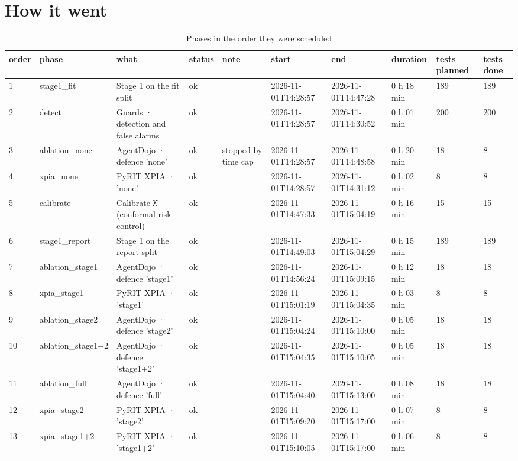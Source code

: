 \documentclass[11pt,a4paper]{article}
\begin{document}
\section*{How it went}
\begin{small}\begin{longtable}{llllllllll}
\caption{Phases in the order they were scheduled}\\
\toprule
order & phase & what & status & note & start & end & duration & tests planned & tests done \\
\midrule\endhead
1 & stage1\_fit & Stage 1 on the fit split & ok &  & 2026-11-01T14:28:57 & 2026-11-01T14:47:28 & 0 h 18 min & 189 & 189 \\
2 & detect & Guards · detection and false alarms & ok &  & 2026-11-01T14:28:57 & 2026-11-01T14:30:52 & 0 h 01 min & 200 & 200 \\
3 & ablation\_none & AgentDojo · defence 'none' & ok & stopped by time cap & 2026-11-01T14:28:57 & 2026-11-01T14:48:58 & 0 h 20 min & 18 & 8 \\
4 & xpia\_none & PyRIT XPIA · 'none' & ok &  & 2026-11-01T14:28:57 & 2026-11-01T14:31:12 & 0 h 02 min & 8 & 8 \\
5 & calibrate & Calibrate λ̂ (conformal risk control) & ok &  & 2026-11-01T14:47:33 & 2026-11-01T15:04:19 & 0 h 16 min & 15 & 15 \\
6 & stage1\_report & Stage 1 on the report split & ok &  & 2026-11-01T14:49:03 & 2026-11-01T15:04:29 & 0 h 15 min & 189 & 189 \\
7 & ablation\_stage1 & AgentDojo · defence 'stage1' & ok &  & 2026-11-01T14:56:24 & 2026-11-01T15:09:15 & 0 h 12 min & 18 & 18 \\
8 & xpia\_stage1 & PyRIT XPIA · 'stage1' & ok &  & 2026-11-01T15:01:19 & 2026-11-01T15:04:35 & 0 h 03 min & 8 & 8 \\
9 & ablation\_stage2 & AgentDojo · defence 'stage2' & ok &  & 2026-11-01T15:04:24 & 2026-11-01T15:10:00 & 0 h 05 min & 18 & 18 \\
10 & ablation\_stage1+2 & AgentDojo · defence 'stage1+2' & ok &  & 2026-11-01T15:04:35 & 2026-11-01T15:10:05 & 0 h 05 min & 18 & 18 \\
11 & ablation\_full & AgentDojo · defence 'full' & ok &  & 2026-11-01T15:04:40 & 2026-11-01T15:13:00 & 0 h 08 min & 18 & 18 \\
12 & xpia\_stage2 & PyRIT XPIA · 'stage2' & ok &  & 2026-11-01T15:09:20 & 2026-11-01T15:17:00 & 0 h 07 min & 8 & 8 \\
13 & xpia\_stage1+2 & PyRIT XPIA · 'stage1+2' & ok &  & 2026-11-01T15:10:05 & 2026-11-01T15:17:00 & 0 h 06 min & 8 & 8 \\

\end{longtable}
\end{small}
\end{document}
